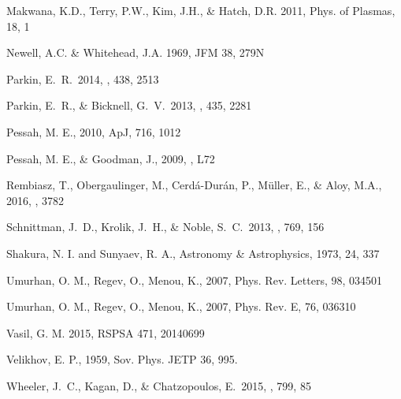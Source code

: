 \documentclass[twocolumn]{aastex61}
\begin{document}
\begin{thebibliography}{}
Makwana, K.D., Terry, P.W., Kim, J.H., \& Hatch, D.R. 2011, Phys. of Plasmas, 18, 1

Newell, A.C. \& Whitehead, J.A. 1969, JFM 38, 279N

 Parkin, E.~R.\ 2014, \mnras, 438, 2513 

 Parkin, E.~R., \& Bicknell, G.~V.\ 2013, \mnras, 435, 2281 

Pessah, M. E., 2010, ApJ, 716, 1012

Pessah, M. E., \& Goodman, J., 2009, , L72 

Rembiasz, T., Obergaulinger, M., Cerd\'a-Dur\'an, P., M\"uller, E., \& Aloy, M.A., 2016, , 3782

 Schnittman, J.~D., Krolik, J.~H., \& Noble, S.~C.\ 2013, \apj, 769, 156 

Shakura, N. I. and Sunyaev, R. A., Astronomy \& Astrophysics, 1973, 24, 337

Umurhan, O. M., Regev, O., Menou, K., 2007, Phys. Rev. Letters, 98, 034501

Umurhan, O. M., Regev, O., Menou, K., 2007, Phys. Rev. E, 76, 036310

Vasil, G. M. 2015, RSPSA 471, 20140699

Velikhov, E. P., 1959, Sov. Phys. JETP 36, 995.

 Wheeler, J.~C., Kagan, D., \& Chatzopoulos, E.\ 2015, \apj, 799, 85 


\end{thebibliography}


\end{document}
